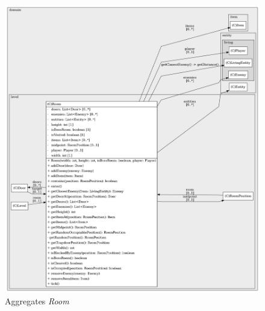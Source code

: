 \vspace{0.5cm}
\begin{figure}[H]
    \centering
    \includegraphics[width=1\linewidth]{Bilder/Visualisierung/RoomAggregate_structure.png}
    \caption{Aggregates \textit{Room}}
\end{figure}
